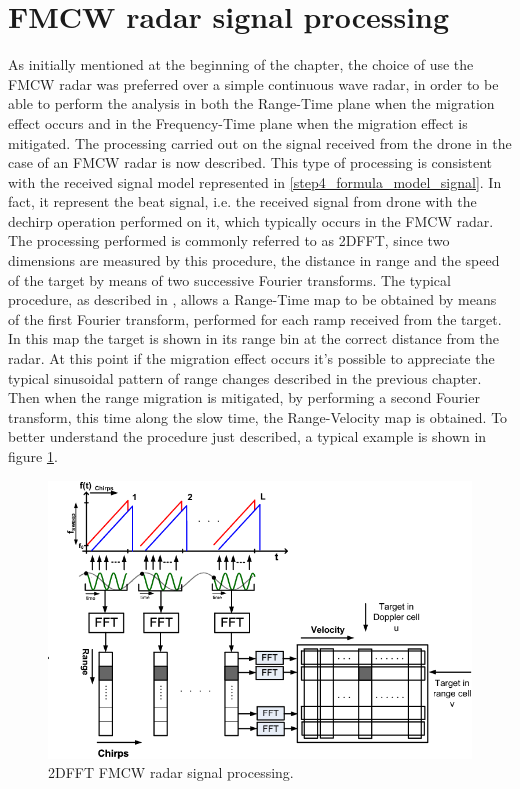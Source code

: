 \section{FMCW radar signal processing}
As initially mentioned at the beginning of the chapter, the choice of use the FMCW radar was preferred over a simple continuous wave radar, in order to be able to perform the analysis in both the Range-Time plane when the migration effect occurs and in the Frequency-Time plane when the migration effect is mitigated. The processing carried out on the signal received from the drone in the case of an FMCW radar is now described. This type of processing is consistent with the received signal model represented in \ref{step4_formula_model_signal}. In fact, it represent the beat signal, i.e. the received signal from drone with the dechirp operation performed on it, which typically occurs in the FMCW radar. The processing performed is commonly referred to as 2DFFT, since two dimensions are measured by this procedure, the distance in range and the speed of the target by means of two successive Fourier transforms. The typical procedure, as described in \cite{2Dprocessing_fmcw}, allows a Range-Time map to be obtained by means of the first Fourier transform, performed for each ramp received from the target. In this map the target is shown in its range bin at the correct distance from the radar. At this point if the migration effect occurs it's possible to appreciate the typical sinusoidal pattern of range changes described in the previous chapter. Then when the range migration is mitigated, by performing a second Fourier transform, this time along the slow time, the Range-Velocity map is obtained. To better understand the procedure just described, a typical example is shown in figure \ref{2dfftimg}.

\begin{figure}[h!]
\centering
\includegraphics[width=12cm]{FMCW mD analysis-chap4/img/2DFFT radar signal processing.png}
\caption{2DFFT FMCW radar signal processing. \cite{Schroeder2010XbandFR}}
\label{2dfftimg}
\end{figure}

